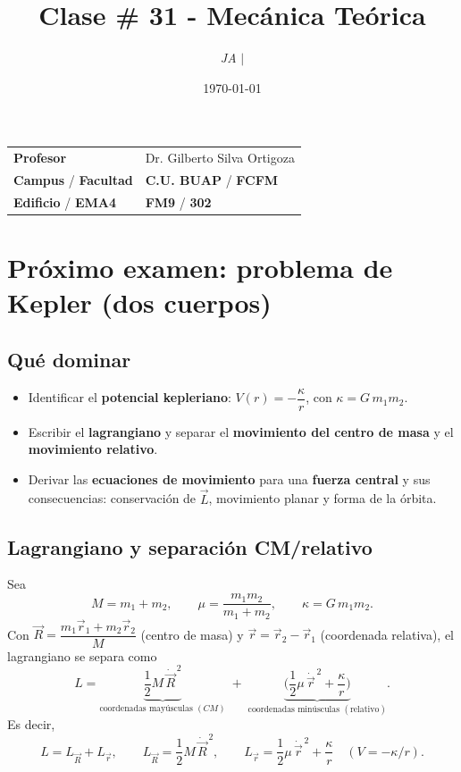 \documentclass{article}
\title{Clase \# 31 - Mecánica Teórica}
\author{\emph{JA} $\boldsymbol{\mid}$}
\date{\today}
\begin{document}
\maketitle



\begin{mybox}
\noindent\begin{tabular}{@{}ll}
	{\bfseries{Profesor}} & Dr. Gilberto Silva Ortigoza\\
	\textcolor{prussianblue}{\bfseries{Campus}} / \textcolor{trueblue}{\bfseries{Facultad}}  & \textcolor{prussianblue}{\bfseries{C.U. BUAP}} /  \textcolor{trueblue}{\bfseries{FCFM}} \\
	\textcolor{prussianblue}{\bfseries{Edificio}} /  \textcolor{trueblue}{\bfseries{EMA4}}    & 	\textcolor{prussianblue}{\bfseries{FM9}} /  \textcolor{trueblue}{\bfseries{302}}   
\end{tabular} 
\end{mybox} \vspace{1cm}

\tableofcontents

\vspace{2cm}

\section{Próximo examen: problema de Kepler (dos cuerpos)}

\subsection*{Qué dominar}
\begin{itemize}
  \item Identificar el \textbf{potencial kepleriano}: \(V(r)=-\dfrac{\kappa}{r}\), con \(\kappa=G\,m_1 m_2\).
  \item Escribir el \textbf{lagrangiano} y separar el \textbf{movimiento del centro de masa} y el \textbf{movimiento relativo}.
  \item Derivar las \textbf{ecuaciones de movimiento} para una \textbf{fuerza central} y sus consecuencias: conservación de \(\vec{L}\), movimiento planar y forma de la órbita.
\end{itemize}

\subsection*{Lagrangiano y separación CM/relativo}
Sea
\[
M=m_1+m_2,\qquad \mu=\frac{m_1 m_2}{m_1+m_2},\qquad \kappa=G\,m_1 m_2.
\]
Con \(\vec{R}=\dfrac{m_1\vec{r}_1+m_2\vec{r}_2}{M}\) (centro de masa) y \(\vec{r}=\vec{r}_2-\vec{r}_1\) (coordenada relativa), el lagrangiano se separa como
\[
L=\underbrace{\frac{1}{2}M\,\dot{\vec{R}}^{\,2}}_{\text{coordenadas mayúsculas }(CM)}
\;+\;
\underbrace{\Big(\frac{1}{2}\mu\,\dot{\vec{r}}^{\,2}+\frac{\kappa}{r}\Big)}_{\text{coordenadas minúsculas }(\text{relativo})}.
\]
Es decir,
\[
L=L_{\vec{R}}+L_{\vec{r}},\qquad
L_{\vec{R}}=\frac{1}{2}M\,\dot{\vec{R}}^{\,2},\qquad
L_{\vec{r}}=\frac{1}{2}\mu\,\dot{\vec{r}}^{\,2}+\frac{\kappa}{r}\quad (V=-\kappa/r).
\]
\end{document}
